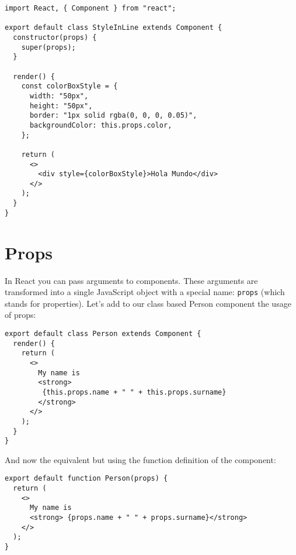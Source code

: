 \documentclass[a4paper, oneside, titlepage, 12pt]{book}
\begin{document}
\begin{verbatim}
import React, { Component } from "react";

export default class StyleInLine extends Component {
  constructor(props) {
    super(props);
  }

  render() {
    const colorBoxStyle = {
      width: "50px",
      height: "50px",
      border: "1px solid rgba(0, 0, 0, 0.05)",
      backgroundColor: this.props.color,
    };

    return (
      <>
        <div style={colorBoxStyle}>Hola Mundo</div>
      </>
    );
  }
}
\end{verbatim}



\section{Props}

In React you can pass arguments to components. These arguments are transformed into a single JavaScript object with a special name: \texttt{props} (which stands for properties). Let's add to our class based Person component the usage of props:

\begin{verbatim}
export default class Person extends Component {
  render() {
    return (
      <>
        My name is 
        <strong> 
         {this.props.name + " " + this.props.surname}
        </strong>
      </>
    );
  }
}
\end{verbatim}

And now the equivalent but using the function definition of the component:

\begin{verbatim}
export default function Person(props) {
  return (
    <>
      My name is 
      <strong> {props.name + " " + props.surname}</strong>
    </>
  );
}
\end{verbatim}
\end{document}
